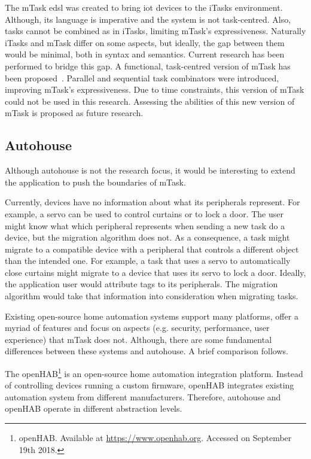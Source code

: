 The \gls{mTask} \acs{edsl} was created to bring \acs{iot} devices to the \gls{iTasks} environment. Although, its language is imperative and the system is not task-centred. Also, tasks cannot be combined as in \gls{iTasks}, limiting \gls{mTask}'s expressiveness. Naturally \gls{iTasks} and \gls{mTask} differ on some aspects, but ideally, the gap between them would be minimal, both in syntax and semantics. Current research has been performed to bridge this gap. A functional, task-centred version of \gls{mTask} has been proposed~\cite{micro}. Parallel and sequential task combinators were introduced, improving \gls{mTask}'s expressiveness. Due to time constraints, this version of \gls{mTask} could not be used in this research. Assessing the abilities of this new version of \gls{mTask} is proposed as future research.

\subsection{Autohouse}

Although \gls{autohouse} is not the research focus, it would be interesting to extend the application to push the boundaries of \gls{mTask}. 

Currently, devices have no information about what its peripherals represent. For example, a servo can be used to control curtains or to lock a door. The user might know what which peripheral represents when sending a new task do a device, but the migration algorithm does not. As a consequence, a task might migrate to a compatible device with a peripheral that controls a different object than the intended one. For example, a task that uses a servo to automatically close curtains might migrate to a device that uses its servo to lock a door. Ideally, the application user would attribute tags to its peripherals. The migration algorithm would take that information into consideration when migrating tasks.

Existing open-source home automation systems support many platforms, offer a myriad of features and focus on aspects (e.g. security, performance, user experience) that \gls{mTask} does not. Although, there are some fundamental differences between these systems and \gls{autohouse}. A brief comparison follows.

The openHAB\footnote{openHAB. Available at \url{https://www.openhab.org}. Accessed on September 19th 2018.} is an open-source home automation integration platform. Instead of controlling devices running a custom firmware, openHAB integrates existing automation system from different manufacturers. Therefore, \gls{autohouse} and openHAB operate in different abstraction levels.

